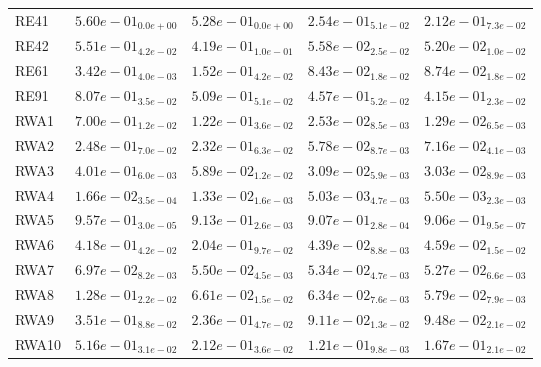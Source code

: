 \documentclass{article}
\begin{document}
\begin{table}
\begin{scriptsize}
\begin{tabular}{lllll}
RE41 & $  5.60e-01_{ 0.0e+00}$ & $  5.28e-01_{ 0.0e+00}$ & \cellcolor{gray25}$  2.54e-01_{ 5.1e-02}$ & \cellcolor{gray95}$  2.12e-01_{ 7.3e-02}$ \\
RE42 & $  5.51e-01_{ 4.2e-02}$ & $  4.19e-01_{ 1.0e-01}$ & \cellcolor{gray25}$  5.58e-02_{ 2.5e-02}$ & \cellcolor{gray95}$  5.20e-02_{ 1.0e-02}$ \\
RE61 & $  3.42e-01_{ 4.0e-03}$ & $  1.52e-01_{ 4.2e-02}$ & \cellcolor{gray95}$  8.43e-02_{ 1.8e-02}$ & \cellcolor{gray25}$  8.74e-02_{ 1.8e-02}$ \\
RE91 & $  8.07e-01_{ 3.5e-02}$ & $  5.09e-01_{ 5.1e-02}$ & \cellcolor{gray25}$  4.57e-01_{ 5.2e-02}$ & \cellcolor{gray95}$  4.15e-01_{ 2.3e-02}$ \\
RWA1 & $  7.00e-01_{ 1.2e-02}$ & $  1.22e-01_{ 3.6e-02}$ & \cellcolor{gray25}$  2.53e-02_{ 8.5e-03}$ & \cellcolor{gray95}$  1.29e-02_{ 6.5e-03}$ \\
RWA2 & $  2.48e-01_{ 7.0e-02}$ & $  2.32e-01_{ 6.3e-02}$ & \cellcolor{gray95}$  5.78e-02_{ 8.7e-03}$ & \cellcolor{gray25}$  7.16e-02_{ 4.1e-03}$ \\
RWA3 & $  4.01e-01_{ 6.0e-03}$ & $  5.89e-02_{ 1.2e-02}$ & \cellcolor{gray25}$  3.09e-02_{ 5.9e-03}$ & \cellcolor{gray95}$  3.03e-02_{ 8.9e-03}$ \\
RWA4 & $  1.66e-02_{ 3.5e-04}$ & $  1.33e-02_{ 1.6e-03}$ & \cellcolor{gray95}$  5.03e-03_{ 4.7e-03}$ & \cellcolor{gray25}$  5.50e-03_{ 2.3e-03}$ \\
RWA5 & $  9.57e-01_{ 3.0e-05}$ & $  9.13e-01_{ 2.6e-03}$ & \cellcolor{gray25}$  9.07e-01_{ 2.8e-04}$ & \cellcolor{gray95}$  9.06e-01_{ 9.5e-07}$ \\
RWA6 & $  4.18e-01_{ 4.2e-02}$ & $  2.04e-01_{ 9.7e-02}$ & \cellcolor{gray95}$  4.39e-02_{ 8.8e-03}$ & \cellcolor{gray25}$  4.59e-02_{ 1.5e-02}$ \\
RWA7 & $  6.97e-02_{ 8.2e-03}$ & $  5.50e-02_{ 4.5e-03}$ & \cellcolor{gray25}$  5.34e-02_{ 4.7e-03}$ & \cellcolor{gray95}$  5.27e-02_{ 6.6e-03}$ \\
RWA8 & $  1.28e-01_{ 2.2e-02}$ & $  6.61e-02_{ 1.5e-02}$ & \cellcolor{gray25}$  6.34e-02_{ 7.6e-03}$ & \cellcolor{gray95}$  5.79e-02_{ 7.9e-03}$ \\
RWA9 & $  3.51e-01_{ 8.8e-02}$ & $  2.36e-01_{ 4.7e-02}$ & \cellcolor{gray95}$  9.11e-02_{ 1.3e-02}$ & \cellcolor{gray25}$  9.48e-02_{ 2.1e-02}$ \\
RWA10 & $  5.16e-01_{ 3.1e-02}$ & $  2.12e-01_{ 3.6e-02}$ & \cellcolor{gray95}$  1.21e-01_{ 9.8e-03}$ & \cellcolor{gray25}$  1.67e-01_{ 2.1e-02}$ \\
\hline
\end{tabular}
\end{scriptsize}
\end{table}
\end{document}
